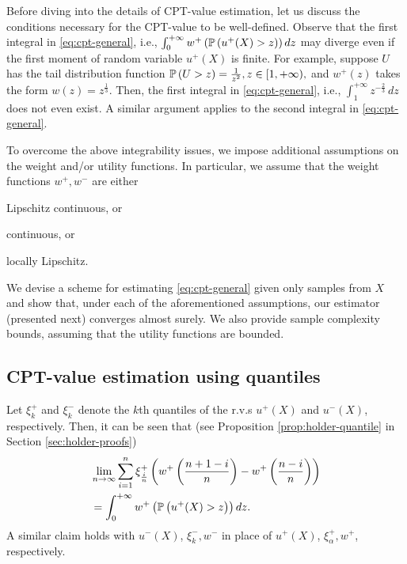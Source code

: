 
Before diving into the details of CPT-value estimation, let us discuss the conditions necessary for the CPT-value to be well-defined.
Observe that the first integral in \eqref{eq:cpt-general}, i.e., 
$\int_0^{+\infty} w^+\left(\mathbb{P}\left( u^+(X)>z \right)\right) d z$
may diverge even if the first moment of random variable $u^+(X)$ is finite. 
For example, suppose $U$ has the tail distribution function
$\mathbb{P}\left( U>z \right)  = \frac{1}{z^2}, z\in [1, +\infty),$
 and $w^+(z)$ takes the form $w(z) = z^{\frac{1}{3}}$. Then, the first integral in \eqref{eq:cpt-general}, i.e.,
$
\int_1^{+\infty}  z^{-\frac{2}{3}}\, dz
$
does not even exist. A similar argument applies to the second integral in \eqref{eq:cpt-general}.

To overcome the above integrability issues, we impose additional  assumptions on the weight and/or utility functions. In particular, we assume that the weight functions $w^+, w^-$ are either 
\begin{inparaenum}[\it (i)]
\item Lipschitz continuous, or
\item \holder continuous, or
\item locally Lipschitz.
\end{inparaenum}
We devise a scheme for estimating \eqref{eq:cpt-general} given only samples from $X$ and show that, under each of the aforementioned assumptions, our estimator (presented next) converges almost surely. 
We also provide sample complexity bounds, assuming that the utility functions are bounded.

\subsection{CPT-value estimation using quantiles}
Let $\xi^+_{k}$ and $\xi^-_{k}$ denote the $k$th quantiles of the r.v.s $u^+(X)$ and $u^-(X)$, respectively. 
Then, it can be seen that (see Proposition \ref{prop:holder-quantile} in Section \ref{sec:holder-proofs})
\begin{align}
&\lim_{n \rightarrow \infty} \sum_{i=1}^{n} \xi^+_{\frac{i}{n}} \left(w^+\left(\frac{n+1-i}{n}\right)- w^+\left(\frac{n-i}{n}\right) \right) \nonumber\\
&= \int_0^{+\infty} w^+\left(\mathbb{P}\left( u^+(X)>z \right)\right) dz.\label{eq:holder-quant-motiv}
\end{align}
A similar claim holds with $u^-(X)$, $\xi^-_{k}, w^-$ in place of  $u^+(X)$, $\xi^+_{\alpha}, w^+$, respectively. 

